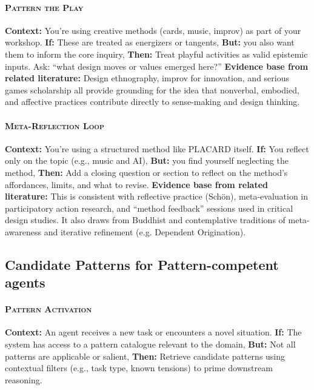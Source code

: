 \documentclass[acmlarge,timestamp]{acmart}
\begin{document}
{\paragraph*{{\scshape Pattern the Play}}

\noindent \textbf{Context:} You’re using creative methods (cards, music, improv) as part of your workshop.
\textbf{If:} These are treated as energizers or tangents,  \textbf{But:} you also want them to inform the core inquiry,
\textbf{Then:} Treat playful activities as valid epistemic inputs. Ask: “what design moves or values emerged here?”
\textbf{Evidence base from related literature:} Design ethnography, improv for innovation, and serious games scholarship all provide grounding for the idea that nonverbal, embodied, and affective practices contribute directly to sense-making and design thinking.

\paragraph*{{\scshape Meta-Reflection Loop}}

\noindent \textbf{Context:} You’re using a structured method like PLACARD itself.
\textbf{If:} You reflect only on the topic (e.g., music and AI), \textbf{But:} you find yourself neglecting the method,
\textbf{Then:} Add a closing question or section to reflect on the method’s affordances, limits, and what to revise.
\textbf{Evidence base from related literature:} This is consistent with reflective practice (Schön), meta-evaluation in participatory action research, and “method feedback” sessions used in critical design studies. It also draws from Buddhist and contemplative traditions of meta-awareness and iterative refinement (e.g. Dependent Origination).

\subsection*{Candidate Patterns for Pattern-competent agents}

\paragraph*{{\scshape Pattern Activation}}

\noindent \textbf{Context:} An agent receives a new task or encounters a novel situation.
 \textbf{If:} The system has access to a pattern catalogue relevant to the domain,
 \textbf{But:} Not all patterns are applicable or salient,
 \textbf{Then:} Retrieve candidate patterns using contextual filters (e.g., task type, known tensions) to prime downstream reasoning.

}
\end{document}
